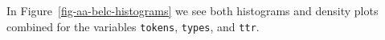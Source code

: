 \documentclass[
  letterpaper,
]{latex/krantz}
\theoremstyle{definition}
\theoremstyle{remark}
\begin{document}
In Figure~\ref{fig-aa-belc-histograms} we see both histograms and
density plots combined for the variables \texttt{tokens},
\texttt{types}, and \texttt{ttr}.

\begin{figure}[H]

\begin{minipage}{0.33\linewidth}



\end{minipage}%
%
\begin{minipage}{0.33\linewidth}

\centering{

}
\end{minipage}
\end{figure}
\end{document}
